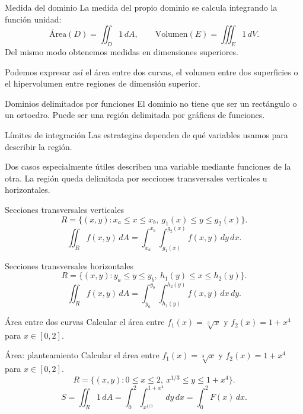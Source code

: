 \documentclass[main.tex]{subfiles}
\begin{document}
\begin{frame}{Medida del dominio}
La medida del propio dominio se calcula integrando la función unidad:\[\text{Área}(D)=\iint_D1\,dA,\qquad\text{Volumen}(E)=\iiint_E1\,dV.\]Del mismo modo obtenemos medidas en dimensiones superiores.\par\medskip Podemos expresar así el área entre dos curvas, el volumen entre dos superficies o el hipervolumen entre regiones de dimensión superior.
\end{frame}

\begin{frame}{Dominios delimitados por funciones}
El dominio no tiene que ser un rectángulo o un ortoedro. Puede ser una región delimitada por gráficas de funciones.
\end{frame}

\begin{frame}{Límites de integración}
Las estrategias dependen de qué variables usamos para describir la región.\par\medskip Dos casos especialmente útiles describen una variable mediante funciones de la otra. La región queda delimitada por \alert{secciones transversales verticales u horizontales}.
\end{frame}

\begin{frame}{Secciones transversales verticales}
\small\[R=\{(x,y):x_a\le x\le x_b,\ g_1(x)\le y\le g_2(x)\}.\]\[\iint_R f(x,y)\,dA=\int_{x_a}^{x_b}\int_{g_1(x)}^{g_2(x)}f(x,y)\,dy\,dx.\]
\end{frame}

\begin{frame}{Secciones transversales horizontales}
\small\[R=\{(x,y):y_a\le y\le y_b,\ h_1(y)\le x\le h_2(y)\}.\]\[\iint_R f(x,y)\,dA=\int_{y_a}^{y_b}\int_{h_1(y)}^{h_2(y)}f(x,y)\,dx\,dy.\]
\end{frame}

\begin{frame}{Área entre dos curvas}
Calcular el área entre $f_1(x)=\sqrt[3]{x}$ y $f_2(x)=1+x^4$ para $x\in[0,2]$.
\end{frame}

\begin{frame}{Área: planteamiento}
\small Calcular el área entre $f_1(x)=\sqrt[3]{x}$ y $f_2(x)=1+x^4$ para $x\in[0,2]$.\[R=\{(x,y):0\le x\le2,\ x^{1/3}\le y\le1+x^4\}.\]\[S=\iint_R1\,dA=\int_0^2\int_{x^{1/3}}^{1+x^4}dy\,dx=\int_0^2 F(x)\,dx.\]
\end{frame}
\end{document}
